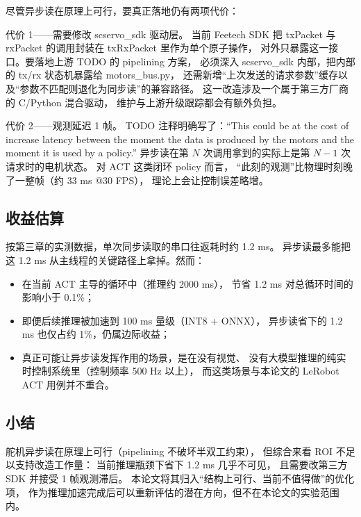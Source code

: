 尽管异步读在原理上可行，要真正落地仍有两项代价：

代价 1——需要修改 scservo\_sdk 驱动层。
当前 Feetech SDK 把 txPacket 与 rxPacket
的调用封装在 txRxPacket 里作为单个原子操作，
对外只暴露这一接口。要落地上游 TODO 的 pipelining 方案，
必须深入 scservo\_sdk 内部，把内部的 tx/rx 状态机暴露给 motors\_bus.py，
还需新增“上次发送的请求参数”缓存以及“参数不匹配则退化为同步读”的兼容路径。
这一改造涉及一个属于第三方厂商的 C/Python 混合驱动，
维护与上游升级跟踪都会有额外负担。

代价 2——观测延迟 1 帧。
TODO 注释明确写了：“This could be at the cost of increase latency between
the moment the data is produced by the motors and the moment it is used by a policy.”
异步读在第 $N$ 次调用拿到的实际上是第 $N-1$ 次请求时的电机状态。
对 ACT 这类闭环 policy 而言，
“此刻的观测”比物理时刻晚了一整帧（约 33 ms @30 FPS），
理论上会让控制误差略增。

\subsection{收益估算}\label{sec:async-read-roi}

按第三章的实测数据，单次同步读取的串口往返耗时约 1.2 ms。
异步读最多能把这 1.2 ms 从主线程的关键路径上拿掉。然而：
\begin{itemize}[leftmargin=2em]
  \item 在当前 ACT 主导的循环中（推理约 2000 ms），
        节省 1.2 ms 对总循环时间的影响小于 0.1\%；
  \item 即便后续推理被加速到 100 ms 量级（INT8 + ONNX），
        异步读省下的 1.2 ms 也仅占约 1\%，仍属边际收益；
  \item 真正可能让异步读发挥作用的场景，是在没有视觉、
        没有大模型推理的纯实时控制系统里（控制频率 500 Hz 以上），
        而这类场景与本论文的 LeRobot ACT 用例并不重合。
\end{itemize}

\subsection{小结}\label{sec:async-read-conclusion}

舵机异步读在原理上可行（pipelining 不破坏半双工约束），
但综合来看 ROI 不足以支持改造工作量：
当前推理瓶颈下省下 1.2 ms 几乎不可见，
且需要改第三方 SDK 并接受 1 帧观测滞后。
本论文将其归入“结构上可行、当前不值得做”的优化项，
作为推理加速完成后可以重新评估的潜在方向，但不在本论文的实验范围内。

